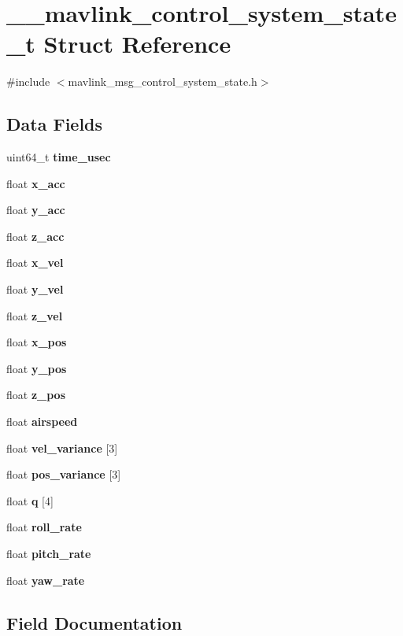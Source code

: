 \section{\+\_\+\+\_\+mavlink\+\_\+control\+\_\+system\+\_\+state\+\_\+t Struct Reference}
\label{struct____mavlink__control__system__state__t}


{\ttfamily \#include $<$mavlink\+\_\+msg\+\_\+control\+\_\+system\+\_\+state.\+h$>$}

\subsection*{Data Fields}
\begin{DoxyCompactItemize}
\item 
uint64\+\_\+t \textbf{ time\+\_\+usec}
\item 
float \textbf{ x\+\_\+acc}
\item 
float \textbf{ y\+\_\+acc}
\item 
float \textbf{ z\+\_\+acc}
\item 
float \textbf{ x\+\_\+vel}
\item 
float \textbf{ y\+\_\+vel}
\item 
float \textbf{ z\+\_\+vel}
\item 
float \textbf{ x\+\_\+pos}
\item 
float \textbf{ y\+\_\+pos}
\item 
float \textbf{ z\+\_\+pos}
\item 
float \textbf{ airspeed}
\item 
float \textbf{ vel\+\_\+variance} [3]
\item 
float \textbf{ pos\+\_\+variance} [3]
\item 
float \textbf{ q} [4]
\item 
float \textbf{ roll\+\_\+rate}
\item 
float \textbf{ pitch\+\_\+rate}
\item 
float \textbf{ yaw\+\_\+rate}
\end{DoxyCompactItemize}


\subsection{Field Documentation}
\mbox{\label{struct____mavlink__control__system__state__t_a2a48553c0ca332797b83fc7147f15679}} 
